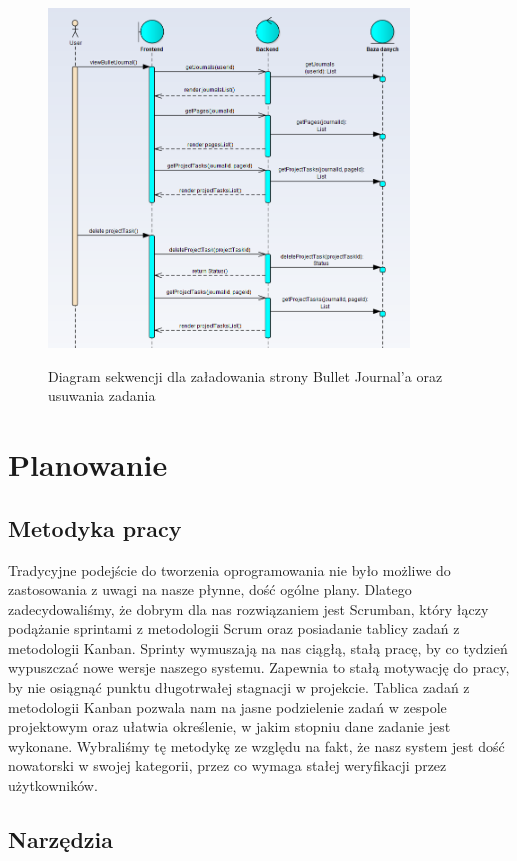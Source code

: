 \documentclass[a4paper,11pt]{report}
\begin{document}
\begin{figure}[h]
	\centering
	\includegraphics[width=\textwidth, height=9cm]{sekwencji1}\\
	\caption{Diagram sekwencji dla załadowania strony Bullet Journal’a oraz usuwania zadania}
	\label{fig:seq2}
\end{figure}
\chapter {Planowanie}
\section{Metodyka pracy}
Tradycyjne podejście do tworzenia oprogramowania nie było możliwe do zastosowania z uwagi na nasze płynne, dość ogólne plany.
 Dlatego zadecydowaliśmy, że dobrym dla nas rozwiązaniem jest Scrumban, który łączy podążanie sprintami z metodologii Scrum
 oraz posiadanie tablicy zadań z metodologii Kanban\cite{agile}.
 Sprinty wymuszają na nas ciągłą, stałą pracę, by co tydzień wypuszczać nowe wersje naszego systemu.
 Zapewnia to stałą motywację do pracy, by nie osiągnąć punktu długotrwałej stagnacji w projekcie.
 Tablica zadań z metodologii Kanban pozwala nam na jasne podzielenie zadań w zespole projektowym
 oraz ułatwia określenie, w jakim stopniu dane zadanie jest wykonane.
 Wybraliśmy tę metodykę ze względu na fakt, że nasz system jest dość nowatorski w swojej kategorii,
 przez co wymaga stałej weryfikacji przez użytkowników.
 
 
\section{Narzędzia}
\end{document}
